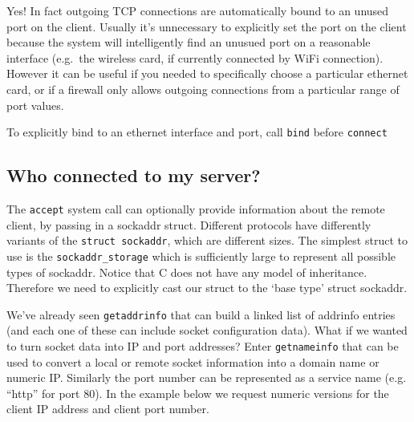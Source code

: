 Yes! In fact outgoing TCP connections are automatically bound to an
unused port on the client. Usually it's unnecessary to explicitly set
the port on the client because the system will intelligently find an
unusued port on a reasonable interface (e.g.~the wireless card, if
currently connected by WiFi connection). However it can be useful if you
needed to specifically choose a particular ethernet card, or if a
firewall only allows outgoing connections from a particular range of
port values.

To explicitly bind to an ethernet interface and port, call \texttt{bind}
before \texttt{connect}

\subsection{Who connected to my
server?}\label{who-connected-to-my-server}

The \texttt{accept} system call can optionally provide information about
the remote client, by passing in a sockaddr struct. Different protocols
have differently variants of the \texttt{struct\ sockaddr}, which are
different sizes. The simplest struct to use is the
\texttt{sockaddr\_storage} which is sufficiently large to represent all
possible types of sockaddr. Notice that C does not have any model of
inheritance. Therefore we need to explicitly cast our struct to the
`base type' struct sockaddr.

\begin{Shaded}
\begin{Highlighting}[]
     
     
            \NormalTok{(} 
\end{Highlighting}
\end{Shaded}

We've already seen \texttt{getaddrinfo} that can build a linked list of
addrinfo entries (and each one of these can include socket configuration
data). What if we wanted to turn socket data into IP and port addresses?
Enter \texttt{getnameinfo} that can be used to convert a local or remote
socket information into a domain name or numeric IP. Similarly the port
number can be represented as a service name (e.g. ``http'' for port 80).
In the example below we request numeric versions for the client IP
address and client port number.

